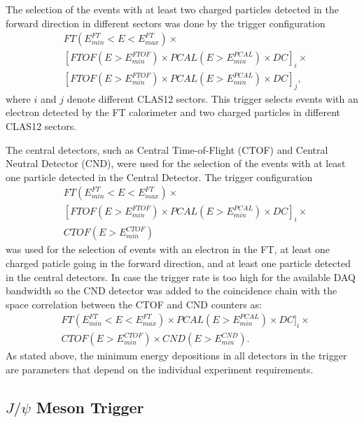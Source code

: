 The selection of the events with at least two charged particles detected in the forward direction in different sectors was done by the trigger configuration
 \begin{align*} 
 &FT(E^{FT}_{min}{<}E{<}E^{FT}_{max})\times\\
 & [FTOF(E{>}E^{FTOF}_{min})\times  PCAL(E{>}E^{PCAL}_{min})\times   DC]_i \times \\
 & [FTOF(E{>}E^{FTOF}_{min})\times  PCAL(E{>}E^{PCAL}_{min})\times   DC]_j,
\end{align*}
where $i$ and $j$ denote different CLAS12 sectors. This trigger selects events with an electron detected by the FT calorimeter and two charged particles in different CLAS12 sectors.
 
The central detectors, such as Central Time-of-Flight (CTOF) and Central Neutral Detector (CND), were used for the selection of the events with at least one  particle detected in the Central Detector. The trigger configuration
 \begin{align*} 
 &FT(E^{FT}_{min}{<}E{<}E^{FT}_{max})\times\\
 & [FTOF(E{>}E^{FTOF}_{min})\times  PCAL(E{>}E^{PCAL}_{min})\times   DC]_i \times \\
 & CTOF(E{>}E^{CTOF}_{min})\end{align*}
\noindent
was used for the selection of events with an electron in the FT, at least one charged paticle going in the forward direction, and at least one particle detected in the central detectors. In case the trigger rate is too high for the available DAQ bandwidth so the CND detector was added to the coincidence chain with the space correlation between the CTOF and CND counters as:
 \begin{align*} 
 &FT(E^{FT}_{min}{<}E{<}E^{FT}_{max})\times PCAL(E{>}E^{PCAL}_{min})\times   DC]_i \times \\
 & CTOF(E{>}E^{CTOF}_{min})\times  CND(E{>}E^{CND}_{min}).
\end{align*}
\noindent
As stated above, the minimum energy depositions in all detectors in the trigger are parameters that depend on the individual experiment requirements.


\subsection{$J/\psi$ Meson Trigger}
\label{sec:meson_trigger}

